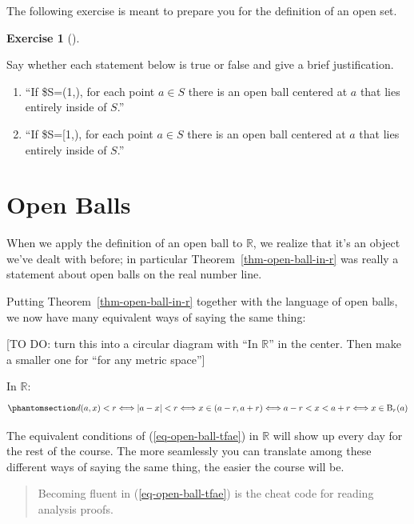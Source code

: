 \documentclass[
  letterpaper,
  DIV=11,
  numbers=noendperiod]{scrreprt}
\providecommand{\tightlist}{%
  \setlength{\itemsep}{0pt}\setlength{\parskip}{0pt}}
\def\R{\mathbb R}
\newcommand{\bee}{\mathrm{B}}
\theoremstyle{plain}
\theoremstyle{definition}
\newtheorem{exercise}{Exercise}[chapter]
\theoremstyle{plain}
\theoremstyle{plain}
\theoremstyle{definition}
\theoremstyle{definition}
\theoremstyle{remark}
\begin{document}
The following exercise is meant to prepare you for the definition of an
open set.

\begin{exercise}[]\protect\hypertarget{exr-neighborhood-within-subset-tf}{}\label{exr-neighborhood-within-subset-tf}

Say whether each statement below is true or false and give a brief
justification.

\begin{enumerate}
\def\labelenumi{\arabic{enumi}.}
\tightlist
\item
  ``If \$S=(1,\infty), for each point \(a\in S\) there is an open ball
  centered at \(a\) that lies entirely inside of \(S\).''
\item
  ``If \$S={[}1,\infty), for each point \(a\in S\) there is an open ball
  centered at \(a\) that lies entirely inside of \(S\).''
\end{enumerate}

\end{exercise}

\section{Open Balls}\label{open-balls}

When we apply the definition of an open ball to \(\R\), we realize that
it's an object we've dealt with before; in particular
Theorem~\ref{thm-open-ball-in-r} was really a statement about open balls
on the real number line.

Putting Theorem~\ref{thm-open-ball-in-r} together with the language of
open balls, we now have many equivalent ways of saying the same thing:

{[}TO DO: turn this into a circular diagram with ``In \(\R\)'' in the
center. Then make a smaller one for ``for any metric space''{]}

In \(\R\):
\begin{equation}\phantomsection\label{eq-open-ball-tfae}{ d(a,x)<r \Longleftrightarrow |a-x|<r \Longleftrightarrow x\in(a-r,a+r) \Longleftrightarrow a-r<x<a+r \Longleftrightarrow x\in\bee_r(a)}\end{equation}

The equivalent conditions of (\ref{eq-open-ball-tfae}) in \(\R\) will
show up every day for the rest of the course. The more seamlessly you
can translate among these different ways of saying the same thing, the
easier the course will be.

\begin{quote}
Becoming fluent in (\ref{eq-open-ball-tfae}) is the cheat code for
reading analysis proofs.
\end{quote}
\end{document}
